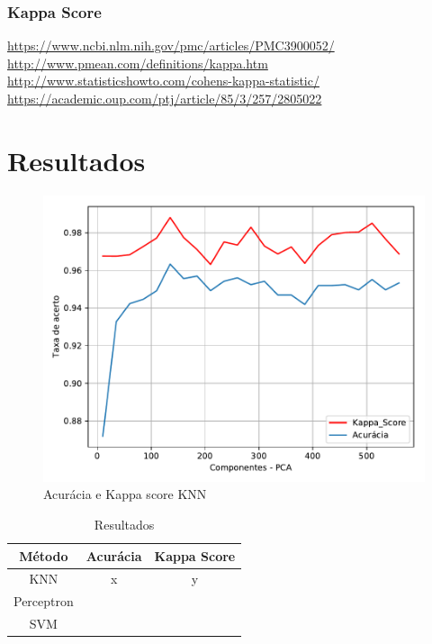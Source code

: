 \documentclass[12pt]{article}
\begin{document}
	\subsubsection{Kappa Score}
	
		\url{https://www.ncbi.nlm.nih.gov/pmc/articles/PMC3900052/}\\
		\url{http://www.pmean.com/definitions/kappa.htm}\\
		\url{http://www.statisticshowto.com/cohens-kappa-statistic/}\\
		\url{https://academic.oup.com/ptj/article/85/3/257/2805022}
		
\section{Resultados}

	\begin{figure}[!htb]
	\centering
	\includegraphics[width=.5\textwidth]{knn_pca_quadratic.pdf}
	\caption{Acurácia e Kappa score KNN}
	\label{fig:knnpcaquadratic}
	\end{figure}

\begin{table}[!htb]
	\centering
	\begin{tabular}{@{}ccc@{}}
		\toprule
		Método& Acurácia &  Kappa Score  \\ \midrule
		KNN & x & y     \\
		Perceptron&  &   \\
		SVM &  &     \\ \bottomrule
	\end{tabular}
	\caption{Resultados}
	\label{table:resultado}
\end{table}
\end{document}
